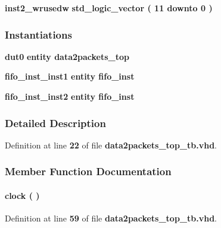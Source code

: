 \begin{DoxyCompactItemize}
\item 
{\bf inst2\+\_\+wrusedw} {\bfseries \textcolor{comment}{std\+\_\+logic\+\_\+vector}\textcolor{vhdlchar}{ }\textcolor{vhdlchar}{(}\textcolor{vhdlchar}{ }\textcolor{vhdlchar}{ } \textcolor{vhdldigit}{11} \textcolor{vhdlchar}{ }\textcolor{keywordflow}{downto}\textcolor{vhdlchar}{ }\textcolor{vhdlchar}{ } \textcolor{vhdldigit}{0} \textcolor{vhdlchar}{ }\textcolor{vhdlchar}{)}\textcolor{vhdlchar}{ }} 
\end{DoxyCompactItemize}
\subsubsection*{Instantiations}
 \begin{DoxyCompactItemize}
\item 
{\bf dut0}  {\bfseries entity data2packets\+\_\+top}   
\item 
{\bf fifo\+\_\+inst\+\_\+inst1}  {\bfseries entity fifo\+\_\+inst}   
\item 
{\bf fifo\+\_\+inst\+\_\+inst2}  {\bfseries entity fifo\+\_\+inst}   
\end{DoxyCompactItemize}


\subsubsection{Detailed Description}


Definition at line {\bf 22} of file {\bf data2packets\+\_\+top\+\_\+tb.\+vhd}.



\subsubsection{Member Function Documentation}
\paragraph[{clock}]{\setlength{\rightskip}{0pt plus 5cm} {\bfseries \textcolor{vhdlchar}{ }} clock ( ) \hspace{0.3cm}{\ttfamily [Process]}}\label{classdata2packets__top__tb_1_1tb__behave_af761a67e9d7ce9e23381088b6f2ae893}


Definition at line {\bf 59} of file {\bf data2packets\+\_\+top\+\_\+tb.\+vhd}.

